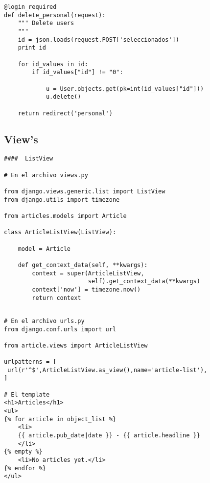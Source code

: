 \documentclass[xcolor=dvipsnames]{beamer}
\begin{document}
\begin{frame}[fragile]
\begin{verbatim}
@login_required
def delete_personal(request):
    """ Delete users 
    """
    id = json.loads(request.POST['seleccionados'])
    print id 
 
    for id_values in id:
        if id_values["id"] != "0":
	           
            u = User.objects.get(pk=int(id_values["id"]))
            u.delete()   
	   
    return redirect('personal')
\end{verbatim}
\end{frame}

\subsection{View's}
\begin{frame}[fragile]
\begin{verbatim}
####  ListView

# En el archivo views.py

from django.views.generic.list import ListView
from django.utils import timezone

from articles.models import Article

class ArticleListView(ListView):

    model = Article

    def get_context_data(self, **kwargs):
        context = super(ArticleListView, 
                        self).get_context_data(**kwargs)
        context['now'] = timezone.now()
        return context

\end{verbatim}
\end{frame}

\begin{frame}[fragile]
\begin{verbatim}

# En el archivo urls.py
from django.conf.urls import url

from article.views import ArticleListView

urlpatterns = [
 url(r'^$',ArticleListView.as_view(),name='article-list'),
]

# El template
<h1>Articles</h1>
<ul>
{% for article in object_list %}
    <li>
    {{ article.pub_date|date }} - {{ article.headline }}
    </li>
{% empty %}
    <li>No articles yet.</li>
{% endfor %}
</ul>
\end{verbatim}
\end{frame}
\end{document}
